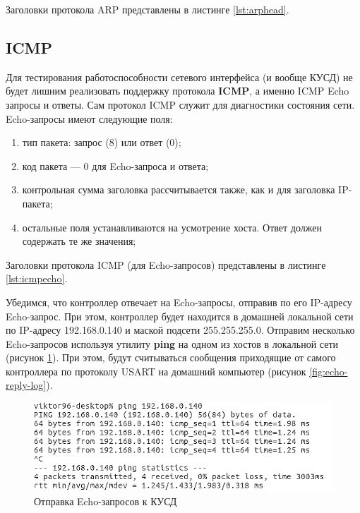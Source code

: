Заголовки протокола ARP представлены в листинге \ref{lst:arphead}.

{\small{}}

\subsection{ICMP}

Для тестирования работоспособности сетевого интерфейса (и вообще КУСД) не будет лишним реализовать поддержку протокола \textbf{ICMP}, а именно ICMP Echo запросы и ответы. Сам протокол ICMP служит для диагностики состояния сети. Echo-запросы имеют следующие поля:
\begin{enumerate}
	\item тип пакета: запрос (8) или ответ (0);
	\item код пакета --- 0 для Echo-запроса и ответа;
	\item контрольная сумма заголовка рассчитывается также, как и для заголовка IP-пакета;
	\item остальные поля устанавливаются на усмотрение хоста. Ответ должен содержать те же значения;
\end{enumerate}

Заголовки протокола ICMP (для Echo-запросов) представлены в листинге \ref{lst:icmpecho}.

{\small{}}

Убедимся, что контроллер отвечает на Echo-запросы, отправив по его IP-адресу Echo-запрос. При этом, контроллер будет находится в домашней локальной сети по IP-адресу 192.168.0.140 и маской подсети 255.255.255.0. Отправим несколько Echo-запросов используя утилиту \textbf{ping} на одном из хостов в локальной сети (рисунок \ref{fig:echo-req}). При этом, будут считываться сообщения приходящие от самого контроллера по протоколу USART на домашний компьютер (рисунок \ref{fig:echo-reply-log}).

\begin{figure}[h!]
	\centering
		\includegraphics[scale=0.8]{img/icmp-req.png}
	\caption{Отправка Echo-запросов к КУСД\label{fig:echo-req}}
\end{figure}

